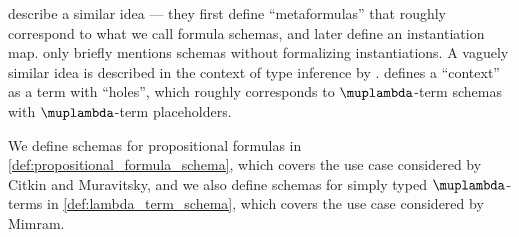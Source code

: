 \begin{comments}
  \item \Textcite[\S 3.1]{CitkinMuravitsky2022ConsequenceRelations} describe a similar idea --- they first define \enquote{metaformulas} that roughly correspond to what we call formula schemas, and later define an instantiation map. \Textcite[20]{Эдельман1975Логика} only briefly mentions schemas without formalizing instantiations. A vaguely similar idea is described in the context of type inference by \textcite[\S 4.4.4]{Mimram2020ProgramEqualsProof}. \Textcite[def. 2.1.18]{Barendregt1984LambdaCalculus} defines a \enquote{context} as a term with \enquote{holes}, which roughly corresponds to \( \muplambda \)-term schemas with \( \muplambda \)-term placeholders.

  We define schemas for propositional formulas in \cref{def:propositional_formula_schema}, which covers the use case considered by Citkin and Muravitsky, and we also define schemas for simply typed \( \muplambda \)-terms in \cref{def:lambda_term_schema}, which covers the use case considered by Mimram.
\end{comments}

